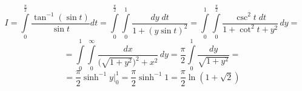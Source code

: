 


	$$I = \int \limits_{0}^{\frac{\pi}{2}} \frac{\tan^{-1} (\sin t)}{\sin t} dt = \int \limits_{0}^{\frac{\pi}{2}} \int \limits_{0}^{1} \frac{dy \; dt}{1+(y \sin t)^2}
	= \int \limits_{0}^{1} \int \limits_{0}^{\frac{\pi}{2}} \frac{\csc^2 t \; dt}{1+\cot^2 t+y^2} \,dy = $$
	$$ 
	= \int \limits_{0}^{1} \int \limits_{0}^{\infty} \frac{dx}{\big(\sqrt{1+y^2}\big)^2+x^2} \,dy 
	= \frac{\pi}{2} \int \limits_{0}^{1} \frac{dy}{\sqrt{1+y^2}} =$$
	$$= \frac{\pi}{2} \sinh^{-1} y \Bigr|_{0}^{1}
	=\frac{\pi}{2} \sinh^{-1} 1
	=\frac{\pi}{2} \ln (1+\sqrt{2})$$
